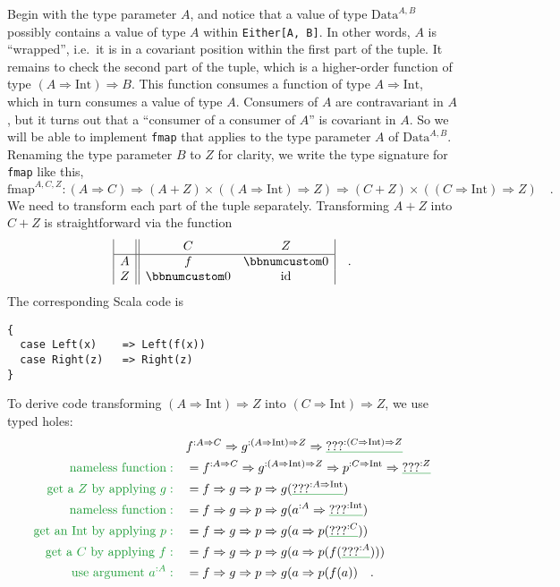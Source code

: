 Begin with the type parameter $A$, and notice that a value of type
$\text{Data}^{A,B}$ possibly contains a value of type $A$ within
\lstinline!Either[A, B]!. In other words, $A$ is ``wrapped'',
i.e.~it is in a covariant position within the first part of the tuple.
It remains to check the second part of the tuple, which is a higher-order
function of type $\left(A\Rightarrow\text{Int}\right)\Rightarrow B$.
This function consumes a function of type $A\Rightarrow\text{Int}$,
which in turn consumes a value of type $A$. Consumers of $A$ are
contravariant in $A$, but it turns out that a ``consumer of a consumer
of $A$'' is covariant in $A$. So we will be able to implement \lstinline!fmap!
that applies to the type parameter $A$ of $\text{Data}^{A,B}$. Renaming
the type parameter $B$ to $Z$ for clarity, we write the type signature
for \lstinline!fmap! like this,
\[
\text{fmap}^{A,C,Z}:\left(A\Rightarrow C\right)\Rightarrow\left(A+Z\right)\times\left(\left(A\Rightarrow\text{Int}\right)\Rightarrow Z\right)\Rightarrow\left(C+Z\right)\times\left(\left(C\Rightarrow\text{Int}\right)\Rightarrow Z\right)\quad.
\]
We need to transform each part of the tuple separately. Transforming
$A+Z$ into $C+Z$ is straightforward via the function
\[
\begin{array}{|c||cc|}
 & C & Z\\
\hline A & f & \bbnum 0\\
Z & \bbnum 0 & \text{id}
\end{array}\quad.
\]
The corresponding Scala code is
\begin{lstlisting}
{
  case Left(x)    => Left(f(x))
  case Right(z)   => Right(z)
}
\end{lstlisting}
To derive code transforming $\left(A\Rightarrow\text{Int}\right)\Rightarrow Z$
into $\left(C\Rightarrow\text{Int}\right)\Rightarrow Z$, we use typed
holes:
\begin{align*}
 & f^{:A\Rightarrow C}\Rightarrow g^{:\left(A\Rightarrow\text{Int}\right)\Rightarrow Z}\Rightarrow\gunderline{\text{???}^{:\left(C\Rightarrow\text{Int}\right)\Rightarrow Z}}\\
{\color{greenunder}\text{nameless function}:}\quad & =f^{:A\Rightarrow C}\Rightarrow g^{:\left(A\Rightarrow\text{Int}\right)\Rightarrow Z}\Rightarrow p^{:C\Rightarrow\text{Int}}\Rightarrow\gunderline{\text{???}^{:Z}}\\
{\color{greenunder}\text{get a }Z\text{ by applying }g:}\quad & =f\Rightarrow g\Rightarrow p\Rightarrow g(\gunderline{\text{???}^{:A\Rightarrow\text{Int}}})\\
{\color{greenunder}\text{nameless function}:}\quad & =f\Rightarrow g\Rightarrow p\Rightarrow g(a^{:A}\Rightarrow\gunderline{\text{???}^{:\text{Int}}})\\
{\color{greenunder}\text{get an Int by applying }p:}\quad & =f\Rightarrow g\Rightarrow p\Rightarrow g(a\Rightarrow p(\gunderline{\text{???}^{:C}}))\\
{\color{greenunder}\text{get a }C\text{ by applying }f:}\quad & =f\Rightarrow g\Rightarrow p\Rightarrow g(a\Rightarrow p(f(\gunderline{\text{???}^{:A}})))\\
{\color{greenunder}\text{use argument }a^{:A}:}\quad & =f\Rightarrow g\Rightarrow p\Rightarrow g(a\Rightarrow p(f(a))\quad.
\end{align*}
